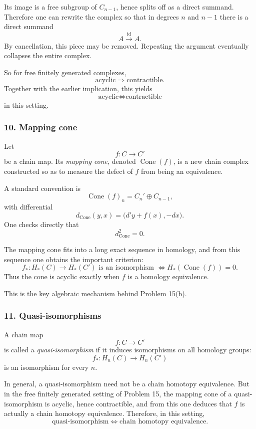 \documentclass[12pt,a4paper]{article}
\theoremstyle{notespace}
\begin{document}
Its image is a free subgroup of \(C_{n-1}\), hence splits off as a direct summand. Therefore one can rewrite the complex so that in degrees \(n\) and \(n-1\) there is a direct summand
\[
A\xrightarrow{\mathrm{id}}A.
\]
By cancellation, this piece may be removed. Repeating the argument eventually collapses the entire complex.

So for free finitely generated complexes,
\[
\boxed{\text{acyclic} \Longrightarrow \text{contractible}.}
\]
Together with the earlier implication, this yields
\[
\boxed{\text{acyclic} \Longleftrightarrow \text{contractible}}
\]
in this setting.

\subsubsection*{10. Mapping cone}

Let
\[
f:C\to C'
\]
be a chain map. Its \emph{mapping cone}, denoted \(\operatorname{Cone}(f)\), is a new chain complex constructed so as to measure the defect of \(f\) from being an equivalence.

A standard convention is
\[
\operatorname{Cone}(f)_n=C_n'\oplus C_{n-1},
\]
with differential
\[
d_{\operatorname{Cone}}(y,x)=\bigl(d'y+f(x),-dx\bigr).
\]
One checks directly that
\[
d_{\operatorname{Cone}}^2=0.
\]

The mapping cone fits into a long exact sequence in homology, and from this sequence one obtains the important criterion:
\[
f_*:H_*(C)\to H_*(C') \text{ is an isomorphism }
\Longleftrightarrow
H_*(\operatorname{Cone}(f))=0.
\]
Thus the cone is acyclic exactly when \(f\) is a homology equivalence.

This is the key algebraic mechanism behind Problem 15(b).

\subsubsection*{11. Quasi-isomorphisms}

A chain map
\[
f:C\to C'
\]
is called a \emph{quasi-isomorphism} if it induces isomorphisms on all homology groups:
\[
f_*:H_n(C)\to H_n(C')
\]
is an isomorphism for every \(n\).

In general, a quasi-isomorphism need not be a chain homotopy equivalence. But in the free finitely generated setting of Problem 15, the mapping cone of a quasi-isomorphism is acyclic, hence contractible, and from this one deduces that \(f\) is actually a chain homotopy equivalence. Therefore, in this setting,
\[
\boxed{\text{quasi-isomorphism} \Longleftrightarrow \text{chain homotopy equivalence}.}
\]
\end{document}
